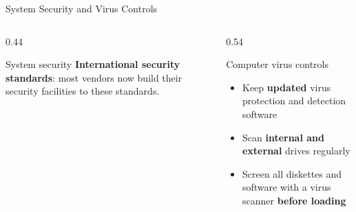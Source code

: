 \documentclass[aspectratio=169,11pt,xcolor={table}]{beamer}
\begin{document}
\begin{frame}{System Security and Virus Controls}
  \begin{columns}[T]
    \begin{column}{0.44\textwidth}
      \begin{block}{System security}
        \small \textbf{International security standards}: most vendors now build their security facilities to these standards.
      \end{block}
      \centering
    \end{column}
    \begin{column}{0.54\textwidth}
      \begin{alertblock}{Computer virus controls}
        \small
        \begin{itemize}\setlength{\itemsep}{2pt}
          \item Keep \textbf{updated} virus protection and detection software
          \item Scan \textbf{internal and external} drives regularly
          \item Screen all diskettes and software with a virus scanner \textbf{before loading}
        \end{itemize}
      \end{alertblock}
      \centering
    \end{column}
  \end{columns}
\end{frame}
\end{document}
